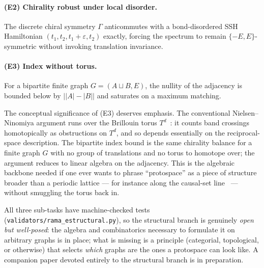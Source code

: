 \paragraph{(E2) Chirality robust under local disorder.}
The discrete chiral symmetry $\Gamma$ anticommutes with a
bond-disordered SSH Hamiltonian
$(t_{1},t_{2},t_{1}{+}\varepsilon,t_{2})$ exactly, forcing the spectrum
to remain $\{-E,E\}$-symmetric without invoking translation invariance.

\paragraph{(E3) Index without torus.}
For a bipartite finite graph $G=(A\sqcup B,E)$, the nullity of the
adjacency is bounded below by $\lvert\lvert A\rvert-\lvert B\rvert\rvert$
and saturates on a maximum matching.

The conceptual significance of (E3) deserves emphasis. The conventional
Nielsen--Ninomiya argument runs over the Brillouin torus
$T^{d}$~\cite{NielsenNinomiya1981a,NielsenNinomiya1981b}: it counts band
crossings homotopically as obstructions on $T^{d}$, and so depends
essentially on the reciprocal-space description. The bipartite index
bound is the same chirality balance for a finite graph $G$ with no
group of translations and no torus to homotope over; the argument
reduces to linear algebra on the adjacency. This is the algebraic
backbone needed if one ever wants to phrase \enquote{protospace} as a
piece of structure broader than a periodic lattice --- for instance
along the causal-set
line~\cite{BombelliLeeMeyerSorkin1987,Sorkin2003} --- without smuggling
the torus back in.

All three sub-tasks have machine-checked tests
(\texttt{validators/rama\_estructural.py}), so the structural branch is
genuinely \emph{open but well-posed}: the algebra and combinatorics
necessary to formulate it on arbitrary graphs is in place; what is
missing is a principle (categorial, topological, or otherwise) that
selects \emph{which} graphs are the ones a protospace can look like. A
companion paper devoted entirely to the structural branch is in
preparation.
